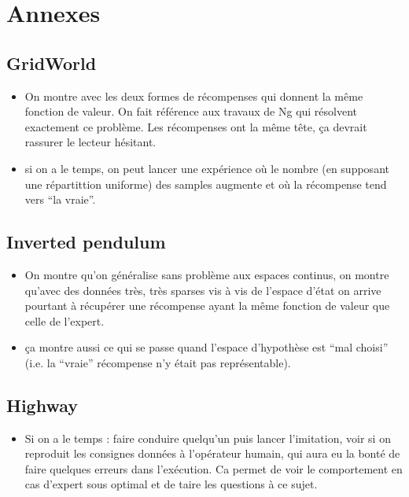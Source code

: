 \documentclass[11pt]{article}
\begin{document}
\section{Annexes}
\label{sec-9}
\subsection{GridWorld}
\label{sec-9-1}

\begin{itemize}
\item On montre avec les deux formes de récompenses qui donnent la même fonction de valeur. On fait référence aux travaux de Ng qui résolvent exactement ce problème. Les récompenses ont la même tête, ça devrait rassurer le lecteur hésitant.
\item si on a le temps, on peut lancer une expérience où le nombre (en supposant une répartittion uniforme) des samples augmente et où la récompense tend vers ``la vraie''.
\end{itemize}
\subsection{Inverted pendulum}
\label{sec-9-2}

\begin{itemize}
\item On montre qu'on généralise sans problème aux espaces continus, on montre qu'avec des données très, très sparses vis à vis de l'espace d'état on arrive pourtant à récupérer une récompense ayant la même fonction de valeur que celle de l'expert.
\item ça montre aussi ce qui se passe quand l'espace d'hypothèse est ``mal choisi'' (i.e. la ``vraie'' récompense n'y était pas représentable).
\end{itemize}
\subsection{Highway}
\label{sec-9-3}

\begin{itemize}
\item Si on a le temps : faire conduire quelqu'un puis lancer l'imitation, voir si on reproduit les consignes données à l'opérateur humain, qui aura eu la bonté de faire quelques erreurs dans l'exécution. Ca permet de voir le comportement en cas d'expert sous optimal et de taire les questions à ce sujet.
\end{itemize}
\end{document}
